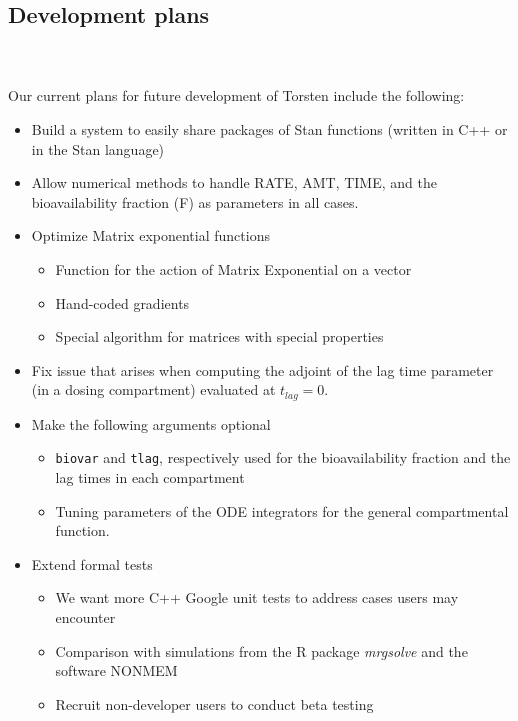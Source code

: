 \documentclass[11pt]{amsart}
\begin{document}
\subsection{Development plans} \ \\ \ \\
Our current plans for future development of Torsten include the following:
\begin{itemize}
  \item Build a system to easily share packages of Stan functions (written in C++ or in the Stan language)
  \item Allow numerical methods to handle RATE, AMT, TIME, and the bioavailability fraction (F) as parameters in all cases.
  \item Optimize Matrix exponential functions
  \begin{itemize}
    \item Function for the action of Matrix Exponential on a vector
    \item Hand-coded gradients
    \item Special algorithm for matrices with special properties
  \end{itemize}
  \item Fix issue that arises when computing the adjoint of the lag time parameter (in a dosing compartment) evaluated at $t_{lag} = 0$. 
  \item Make the following arguments optional
  \begin{itemize}
    \item \texttt{biovar} and \texttt{tlag}, respectively used for the bioavailability fraction and the lag times in each compartment
    \item Tuning parameters of the ODE integrators for the general compartmental function.
  \end{itemize}
  \item Extend formal tests
  \begin{itemize}
    \item We want more C++ Google unit tests to address cases users may encounter 
    \item Comparison with simulations from the R package \textit{mrgsolve} and the software NONMEM\textregistered
    \item Recruit non-developer users to conduct beta testing
  \end{itemize}
\end{itemize}
\end{document}
